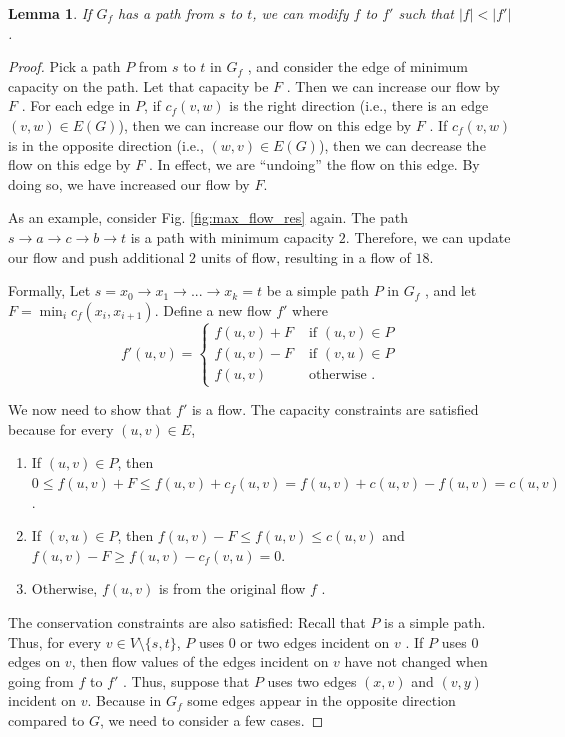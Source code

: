 \documentclass [12pt]{article}
\newtheorem{lemma}[theorem]{Lemma}
\theoremstyle{definition}
\begin{document}
\begin{lemma}
If $G_f$ has a path from $s$ to $t$, we can modify $f$ to $f'$ such that $|f | < |f'|$.
\end{lemma}
\begin{proof}

Pick a path $P$ from $s$ to $t$ in $G_f$ , and consider the edge of minimum capacity on the path. Let that capacity be $F$ . Then we can increase our flow by $F$ . For each edge in $P$, if $c_f (v, w)$ is the right direction (i.e., there is an edge $(v, w) \in E(G)$), then we can increase our flow on this edge by $F$ . If $c_f (v, w)$ is in the opposite direction (i.e., $(w, v ) \in E(G)$), then we can decrease the flow on this edge by $F$ . In effect, we are ``undoing'' the flow on this edge. By doing so, we have increased our flow by $F$. 

As an example, consider Fig. \ref{fig:max_flow_res} again. The path $s \to a \to c \to b \to t$ is a path with minimum capacity $2$. Therefore, we can update our flow and push additional $2$ units of flow, resulting in a flow of $18$. 

Formally, Let $s = x_0 \to x_1 \to ... \to x_k = t$ be a simple path $P$ in $G_f$ , and let $F = \min_i c_f (x_i , x_{i+1})$. Define a new flow $f'$ where 
$$
f' (u, v ) = \begin{cases}
    f (u, v ) + F & \text{ if }(u, v ) \in P\\
    f (u, v ) - F & \text{ if }(v, u) \in P \\
    f (u, v ) & \text{ otherwise }.
    \end{cases}
$$

We now need to show that $f'$ is a flow. The capacity constraints are satisfied because for every $(u, v ) \in E$,
\begin{enumerate}
    \item If $(u, v ) \in P$, then $0 \leq f (u, v ) + F \leq f (u, v ) +c_f (u, v ) = f (u, v ) +c(u, v )-f (u, v ) = c(u, v )$. 
    \item If $(v, u) \in P$, then $f (u, v ) - F \leq f (u, v ) \leq c(u, v )$ and $f (u, v ) - F \geq f (u, v ) - c_f (v, u) = 0$.
    \item Otherwise, $f (u, v )$ is from the original flow $f$ .
\end{enumerate}

The conservation constraints are also satisfied: Recall that $P$ is a simple path. Thus, for every $v \in V \setminus \{s, t\}$, $P$ uses $0$ or two edges incident on $v$ . If $P$ uses $0$ edges on $v$, then flow values of the edges incident on $v$ have not changed when going from $f$ to $f'$ . Thus, suppose that $P$ uses two edges $(x, v )$ and $(v, y )$ incident on $v$. Because in $G_f$ some edges appear in the opposite direction compared to $G$, we need to consider a few cases. 


\end{proof}
\end{document}
